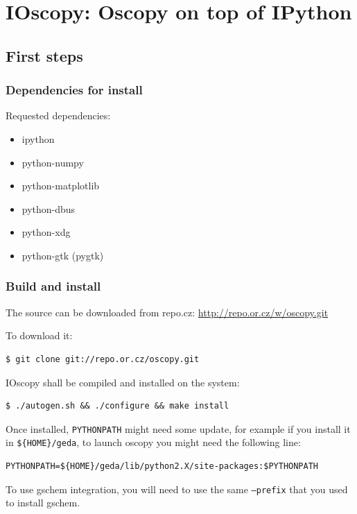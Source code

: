 \documentclass[a4paper,11pt]{report}
\begin{document}
\chapter{IOscopy: Oscopy on top of IPython}

\section{First steps}
\subsection{Dependencies for install}
Requested dependencies:
\begin{itemize}
\item    ipython
\item    python-numpy
\item    python-matplotlib
\item    python-dbus
\item    python-xdg
\item python-gtk (pygtk)
\end{itemize}

\subsection{Build and install}
The source can be downloaded from repo.cz: \href{http://repo.or.cz/w/oscopy.git}{http://repo.or.cz/w/oscopy.git}

To download it:
\begin{lstlisting}
$ git clone git://repo.or.cz/oscopy.git
\end{lstlisting}

IOscopy shall be compiled and installed on the system:
\begin{lstlisting}
$ ./autogen.sh && ./configure && make install
\end{lstlisting}
Once installed, \texttt{PYTHONPATH} might need some update, for example if you install it in \texttt{\$\{HOME\}/geda}, to launch oscopy you might need the following line:
\begin{lstlisting}
PYTHONPATH=${HOME}/geda/lib/python2.X/site-packages:$PYTHONPATH
\end{lstlisting}
To use gschem integration, you will need to use the same \texttt{--prefix} that you used to install gschem. 
\end{document}
